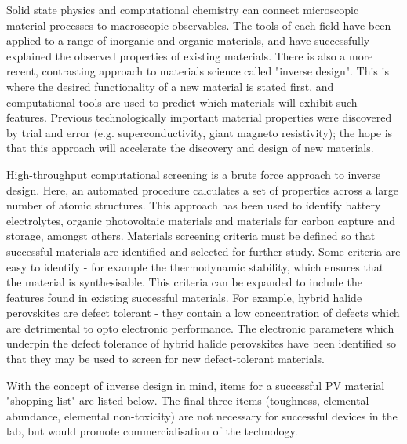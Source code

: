Solid state physics and computational chemistry can connect microscopic material processes to macroscopic observables. The tools of each field have been applied to a range of inorganic and organic materials, and have successfully explained the observed properties of existing materials.
There is also a more recent, contrasting approach to materials science called "inverse design". This is where the desired functionality of a new material is stated first, and computational tools are used to predict which materials will exhibit such features.\autocite{Zunger2018}
Previous technologically important material properties were discovered by trial and error (e.g. superconductivity, giant magneto resistivity); the hope is that this approach will accelerate the discovery and design of new materials.

High-throughput computational screening is a brute force approach to inverse design. Here, an automated procedure calculates a set of properties across a large number of atomic structures. This approach has been used to identify battery electrolytes, organic photovoltaic materials and materials for carbon capture and storage, amongst others. Materials screening criteria must be defined so that successful materials are identified and selected for further study. Some criteria are easy to identify - for example the thermodynamic stability, which ensures that the material is synthesisable. This criteria can be expanded to include the features found in existing successful materials. For example, hybrid halide perovskites are defect tolerant - they contain a low concentration of defects which are detrimental to opto electronic performance. The electronic parameters which underpin the defect tolerance of hybrid halide perovskites have been identified so that they may be used to screen for new defect-tolerant materials.\autocite{Brandt2015} 

With the concept of inverse design in mind, items for a successful PV material "shopping list" are listed below. The final three items (toughness, elemental abundance, elemental non-toxicity) are not necessary for successful devices in the lab, but would promote commercialisation of the technology.

